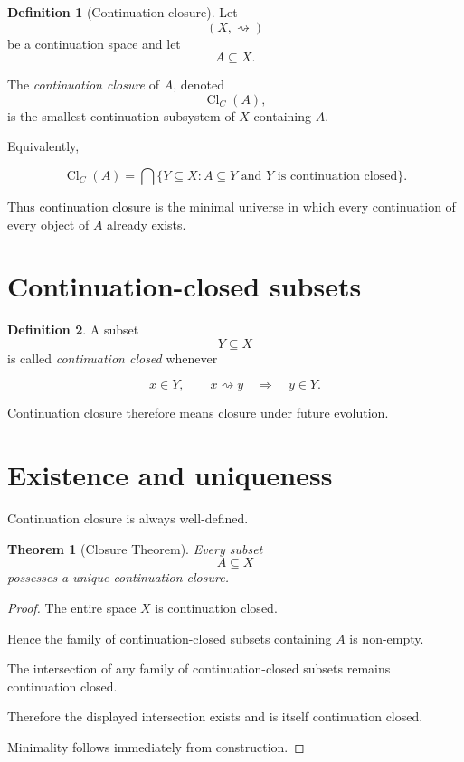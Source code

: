 \documentclass[13pt,openany]{book}
\theoremstyle{plain}
\newtheorem{theorem}{Theorem}[chapter]
\theoremstyle{definition}
\newtheorem{definition}{Definition}[chapter]
\begin{document}
\begin{definition}[Continuation closure]
Let
\[
(X,\rightsquigarrow)
\]
be a continuation space and let
\[
A\subseteq X.
\]

The \emph{continuation closure} of \(A\), denoted
\[
\operatorname{Cl}_C(A),
\]
is the smallest continuation subsystem of \(X\) containing \(A\).

Equivalently,

\[
\operatorname{Cl}_C(A)
=
\bigcap
\{
Y\subseteq X:
A\subseteq Y
\text{ and }
Y
\text{ is continuation closed}
\}.
\]

\end{definition}

Thus continuation closure is the minimal universe in which every continuation
of every object of \(A\) already exists.


\section{Continuation-closed subsets}

\begin{definition}

A subset
\[
Y\subseteq X
\]
is called \emph{continuation closed}
whenever

\[
x\in Y,
\qquad
x\rightsquigarrow y
\quad\Longrightarrow\quad
y\in Y.
\]

\end{definition}

Continuation closure therefore means closure under future evolution.


\section{Existence and uniqueness}

Continuation closure is always well-defined.

\begin{theorem}[Closure Theorem]

Every subset
\[
A\subseteq X
\]
possesses a unique continuation closure.

\end{theorem}

\begin{proof}

The entire space \(X\) is continuation closed.

Hence the family of continuation-closed subsets containing \(A\) is
non-empty.

The intersection of any family of continuation-closed subsets remains
continuation closed.

Therefore the displayed intersection exists and is itself continuation
closed.

Minimality follows immediately from construction.

\end{proof}
\end{document}
